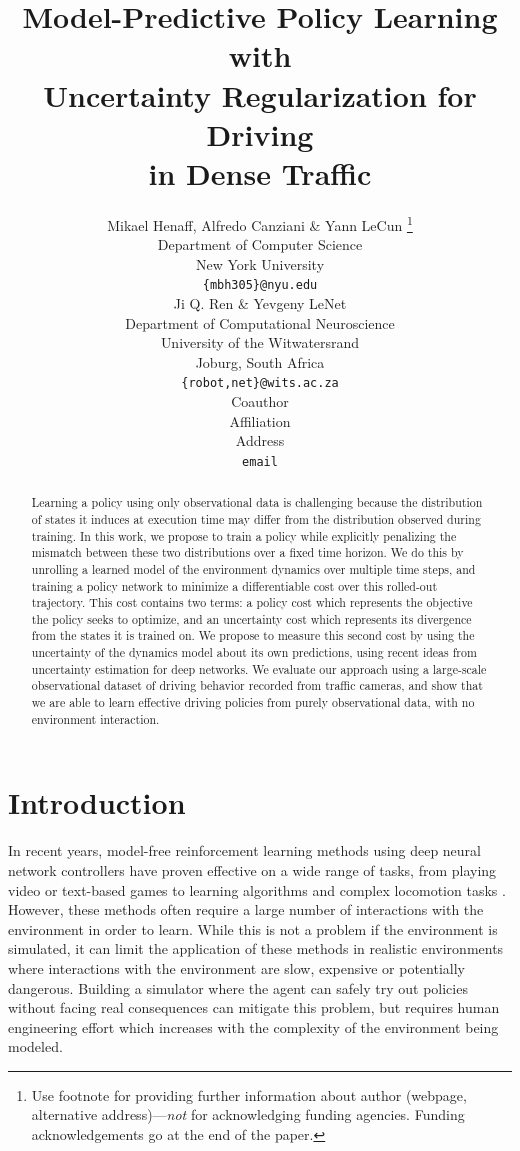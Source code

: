 \documentclass{article} %
\title{
  Model-Predictive Policy Learning with \\
  Uncertainty Regularization for Driving \\
  in Dense Traffic
}
\author{Mikael Henaff, Alfredo Canziani \& Yann LeCun \thanks{ Use footnote for providing further information
about author (webpage, alternative address)---\emph{not} for acknowledging
funding agencies.  Funding acknowledgements go at the end of the paper.} \\
Department of Computer Science\\
New York University\\
\texttt{\{mbh305\}@nyu.edu} \\
\And
Ji Q. Ren \& Yevgeny LeNet \\
Department of Computational Neuroscience \\
University of the Witwatersrand \\
Joburg, South Africa \\
\texttt{\{robot,net\}@wits.ac.za} \\
\AND
Coauthor \\
Affiliation \\
Address \\
\texttt{email}
}
\begin{document}
\newcommand{\modelnamedrop}{MPUR }
\newcommand{\modelnameil}{MPER }

\maketitle

\begin{abstract}
  Learning a policy using only observational data is challenging because the distribution of states it induces at execution time may differ from the distribution observed during training.
  In this work, we propose to train a policy while explicitly penalizing the mismatch between these two distributions over a fixed time horizon.
  We do this by unrolling a learned model of the environment dynamics over multiple time steps, and training a policy network to minimize a differentiable cost over this rolled-out trajectory. This cost contains two terms: a policy cost which represents the objective the policy seeks to optimize, and an uncertainty cost which represents its divergence from the states it is trained on.
We propose to measure this second cost by using the uncertainty of the dynamics model about its own predictions, using recent ideas from uncertainty estimation for deep networks.
  We evaluate our approach using a large-scale observational dataset of driving behavior recorded from traffic cameras, and show that we are able to learn effective driving policies from purely observational data, with no environment interaction.
\end{abstract}


\section{Introduction}

In recent years, model-free reinforcement learning methods using deep neural network controllers have proven effective on a wide range of tasks, from playing video or text-based games \citep{mnih15, A3C, NarasimhanKB15} to learning algorithms \citep{Zaremba15} and complex locomotion tasks \citep{Lillicrap2015, ZhangLMUC15}.
However, these methods often require a large number of interactions with the environment in order to learn.
While this is not a problem if the environment is simulated, it can limit the application of these methods in realistic environments where interactions with the environment are slow, expensive or potentially dangerous.
Building a simulator where the agent can safely try out policies without facing real consequences can mitigate this problem, but requires human engineering effort which increases with the complexity of the environment being modeled.
\end{document}
